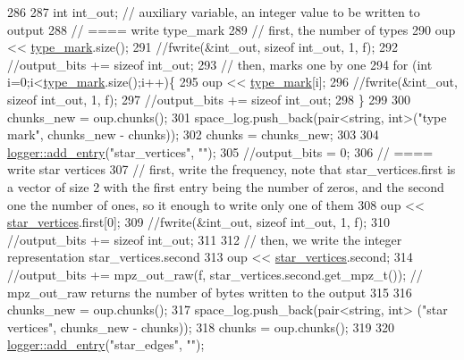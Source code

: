 \begin{DoxyCode}
286 
287   \textcolor{keywordtype}{int} int\_out; \textcolor{comment}{// auxiliary variable, an integer value to be written to output}
288   \textcolor{comment}{// ==== write type\_mark}
289   \textcolor{comment}{// first, the number of types}
290   oup <<  \hyperlink{classmarked__graph__compressed_a86b00223525703e973415cbc9c94da68}{type\_mark}.size();
291   \textcolor{comment}{//fwrite(&int\_out, sizeof int\_out, 1, f);}
292   \textcolor{comment}{//output\_bits += sizeof int\_out;}
293   \textcolor{comment}{// then, marks one by one}
294   \textcolor{keywordflow}{for} (\textcolor{keywordtype}{int} i=0;i<\hyperlink{classmarked__graph__compressed_a86b00223525703e973415cbc9c94da68}{type\_mark}.size();i++)\{
295     oup <<  \hyperlink{classmarked__graph__compressed_a86b00223525703e973415cbc9c94da68}{type\_mark}[i];
296     \textcolor{comment}{//fwrite(&int\_out, sizeof int\_out, 1, f);}
297     \textcolor{comment}{//output\_bits += sizeof int\_out;}
298   \}
299 
300   chunks\_new = oup.chunks();
301   space\_log.push\_back(pair<string, int>(\textcolor{stringliteral}{"type mark"}, chunks\_new - chunks));
302   chunks = chunks\_new;
303 
304   \hyperlink{classlogger_a710163deb17bc81f70d53d285b8ac9ac}{logger::add\_entry}(\textcolor{stringliteral}{"star\_vertices"}, \textcolor{stringliteral}{""});
305   \textcolor{comment}{//output\_bits = 0;}
306   \textcolor{comment}{// ==== write star vertices}
307   \textcolor{comment}{// first, write the frequency, note that star\_vertices.first is a vector of size 2 with the first entry
       being the number of zeros, and the second one the number of ones, so it enough to write only one of them}
308   oup << \hyperlink{classmarked__graph__compressed_a7a4ced4586e2e353f9076bd447df5208}{star\_vertices}.first[0];
309   \textcolor{comment}{//fwrite(&int\_out, sizeof int\_out, 1, f);}
310   \textcolor{comment}{//output\_bits += sizeof int\_out;}
311 
312   \textcolor{comment}{// then, we write the integer representation star\_vertices.second}
313   oup << \hyperlink{classmarked__graph__compressed_a7a4ced4586e2e353f9076bd447df5208}{star\_vertices}.second;
314   \textcolor{comment}{//output\_bits +=  mpz\_out\_raw(f, star\_vertices.second.get\_mpz\_t()); // mpz\_out\_raw returns the number of
       bytes written to the output}
315 
316   chunks\_new = oup.chunks();
317   space\_log.push\_back(pair<string, int> (\textcolor{stringliteral}{"star vertices"}, chunks\_new - chunks));
318   chunks = oup.chunks();
319 
320   \hyperlink{classlogger_a710163deb17bc81f70d53d285b8ac9ac}{logger::add\_entry}(\textcolor{stringliteral}{"star\_edges"}, \textcolor{stringliteral}{""});

\end{DoxyCode}
